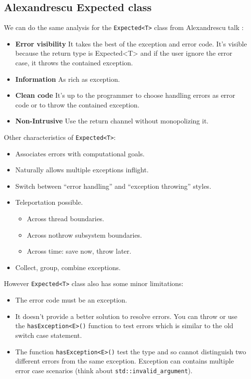 \documentclass[a4paper,10pt]{article}
\newcommand{\cpp}[1]{\lstinline{#1}}
\begin{document}
\subsection{Alexandrescu Expected class}

We can do the same analysis for the \cpp{Expected<T>} class from Alexandrescu talk \cite{AlexandrescuExpected}:

\begin{itemize}
 \item \textbf{Error visibility} It takes the best of the exception and error code. It's visible because the return type is Expected<T> and if the user ignore the error case, it throws the contained exception.
 \item \textbf{Information} As rich as exception.
 \item \textbf{Clean code} It's up to the programmer to choose handling errors as error code or to throw the contained exception.
 \item \textbf{Non-Intrusive} Use the return channel without monopolizing it.
\end{itemize}

\noindent
Other characteristics of \cpp{Expected<T>}:

\begin{itemize}
 \item Associates errors with computational goals.
 \item Naturally allows multiple exceptions inflight.
 \item Switch between ``error handling'' and ``exception throwing'' styles.
 \item Teleportation possible.
 \begin{itemize}
  \item Across thread boundaries.
  \item Across nothrow subsystem boundaries.
  \item Across time: save now, throw later.
 \end{itemize}
 \item Collect, group, combine exceptions.
\end{itemize}

\noindent
However \cpp{Expected<T>} class also has some minor limitations:
\begin{itemize}
 \item The error code must be an exception.
 \item It doesn't provide a better solution to resolve errors. You can throw or use the \cpp{hasException<E>()} function to test errors which is similar to the old switch case statement.
 \item The function \cpp{hasException<E>()} test the type and so cannot distinguish two different errors from the same exception. Exception can contains multiple error case scenarios (think about \cpp{std::invalid_argument}).
\end{itemize}
\end{document}
